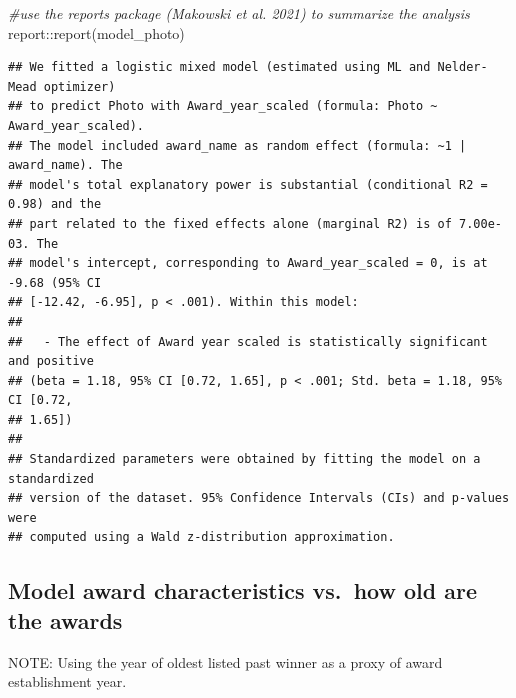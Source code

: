\documentclass[
]{article}
\newenvironment{Shaded}{\begin{snugshade}}{\end{snugshade}}
\newcommand{\CommentTok}[1]{\textcolor[rgb]{0.56,0.35,0.01}{\textit{#1}}}
\newcommand{\FunctionTok}[1]{\textcolor[rgb]{0.00,0.00,0.00}{#1}}
\newcommand{\NormalTok}[1]{#1}
\newcommand{\SpecialCharTok}[1]{\textcolor[rgb]{0.00,0.00,0.00}{#1}}
\begin{document}
\begin{Shaded}
\begin{Highlighting}[]
\CommentTok{\#use the reports package (Makowski et al. 2021) to summarize the analysis}
\NormalTok{report}\SpecialCharTok{::}\FunctionTok{report}\NormalTok{(model\_photo)}
\end{Highlighting}
\end{Shaded}

\begin{verbatim}
## We fitted a logistic mixed model (estimated using ML and Nelder-Mead optimizer)
## to predict Photo with Award_year_scaled (formula: Photo ~ Award_year_scaled).
## The model included award_name as random effect (formula: ~1 | award_name). The
## model's total explanatory power is substantial (conditional R2 = 0.98) and the
## part related to the fixed effects alone (marginal R2) is of 7.00e-03. The
## model's intercept, corresponding to Award_year_scaled = 0, is at -9.68 (95% CI
## [-12.42, -6.95], p < .001). Within this model:
## 
##   - The effect of Award year scaled is statistically significant and positive
## (beta = 1.18, 95% CI [0.72, 1.65], p < .001; Std. beta = 1.18, 95% CI [0.72,
## 1.65])
## 
## Standardized parameters were obtained by fitting the model on a standardized
## version of the dataset. 95% Confidence Intervals (CIs) and p-values were
## computed using a Wald z-distribution approximation.
\end{verbatim}

\hypertarget{model-award-characteristics-vs.-how-old-are-the-awards}{%
\subsection{Model award characteristics vs.~how old are the
awards}\label{model-award-characteristics-vs.-how-old-are-the-awards}}

NOTE: Using the year of oldest listed past winner as a proxy of award
establishment year.
\end{document}
